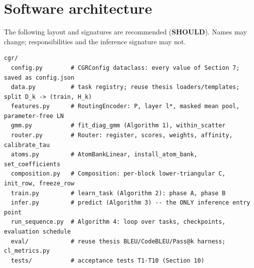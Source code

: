\documentclass[11pt]{article}
\newcommand{\SHOULD}{\textbf{SHOULD}}
\begin{document}
\section{Software architecture}\label{sec:software}

The following layout and signatures are recommended (\SHOULD). Names may change; responsibilities and the
inference signature may not.

\begin{lstlisting}
cgr/
  config.py        # CGRConfig dataclass: every value of Section 7; saved as config.json
  data.py          # task registry; reuse thesis loaders/templates; split D_k -> (train, H_k)
  features.py      # RoutingEncoder: P, layer l*, masked mean pool, parameter-free LN
  gmm.py           # fit_diag_gmm (Algorithm 1), within_scatter
  router.py        # Router: register, scores, weights, affinity, calibrate_tau
  atoms.py         # AtomBankLinear, install_atom_bank, set_coefficients
  composition.py   # Composition: per-block lower-triangular C, init_row, freeze_row
  train.py         # learn_task (Algorithm 2): phase A, phase B
  infer.py         # predict (Algorithm 3) -- the ONLY inference entry point
  run_sequence.py  # Algorithm 4: loop over tasks, checkpoints, evaluation schedule
  eval/            # reuse thesis BLEU/CodeBLEU/Pass@k harness; cl_metrics.py
  tests/           # acceptance tests T1-T10 (Section 10)
\end{lstlisting}
\end{document}
